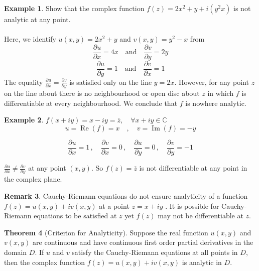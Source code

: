 \documentclass[11pt,a4paper]{article}
\theoremstyle{definition}
\newtheorem{thm}{Theorem}[section]
\newtheorem{example}[thm]{Example}
\newtheorem{remark}[thm]{Remark}
\begin{document}
\begin{example}
Show that the complex function $f(z) = 2x^2 + y+ i(y^2  x)$ is not analytic at any point.\\

\text{\textcolor{red}{Solution}}\\
Here, we identify $u(x,y)   = 2x^2 + y$ and $v(x,y)  = y^2 - x$ from $$\frac{\partial u}{\partial x} = 4x\quad  \text{and} \quad \frac{\partial v}{\partial y } = 2y$$ $$\frac{\partial u}{\partial y}= 1 \quad  \text{and} \quad  \frac{\partial v}{\partial x} = 1$$
The equality $\frac{\partial u}{\partial x} = \frac{\partial v}{\partial y}$ is satisfied only on the line $y = 2x$. However, for any point $z$ on the line about there is no neighbourhood or open disc about $z$ in which $f$ is differentiable at every neighbourhood. We conclude that $f$ is nowhere analytic.
\end{example}

\begin{example}
$f(x  + iy) = x - iy = \overline{z}, \quad  \forall x + iy \in \mathbb{C}$
$$u = \operatorname{Re}(f) = x\quad ,\quad  v  = \operatorname{Im}(f) = -y$$

$$\frac{\partial u}{\partial x} = 1\,,\quad  \frac{\partial v}{\partial x} = 0\,,\quad  \frac{\partial u}{\partial y }= 0\,,\quad  \frac{\partial v}{\partial y} = -1$$

$\frac{\partial u}{\partial x}\neq \frac{\partial v}{\partial y}$ at any point $(x,y)$.
So $f(z) = \overline{z}$ is not differentiable at any point in the complex plane.
\end{example}

\begin{remark}
Cauchy-Riemann equations do not ensure analyticity of a function $f(z)  = u(x,y) + iv(x,y)$ at a point $z = x + iy$ . It is possible for Cauchy-Riemann equations to be satisfied at $z$ yet $f(z)$ may not be differentiable at $z$.
\end{remark}

\begin{thm}[Criterion for Analyticity]
Suppose the real function $u(x,y)$ and $v(x,y)$ are continuous and have continuous first order partial derivatives in the domain $D$. If $u$ and $v$ satisfy the Cauchy-Riemann equations at all points in $D$, then the complex function $f(z) = u(x,y) + iv(x,y)$ is analytic in $D$.
\end{thm}
\end{document}
